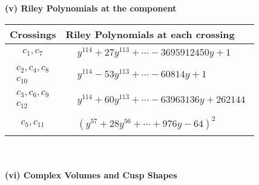 \documentclass[1p]{elsarticle_modified}
\theoremstyle{definition}
\begin{document}
\newpage\renewcommand{\arraystretch}{1}
\flushleft \textbf{(v) Riley Polynomials at the component}\newline \\
\begin{tabular}{m{50pt}|m{274pt}}
Crossings & \hspace{64pt}Riley Polynomials at each crossing \\
\hline $$\begin{aligned}c_{1},c_{7}\end{aligned}$$&$\begin{aligned}
&y^{114}+27 y^{113}+\cdots-3695912450 y+1
\end{aligned}$\\
\hline $$\begin{aligned}c_{2},c_{4},c_{8}\\c_{10}\end{aligned}$$&$\begin{aligned}
&y^{114}-53 y^{113}+\cdots-60814 y+1
\end{aligned}$\\
\hline $$\begin{aligned}c_{3},c_{6},c_{9}\\c_{12}\end{aligned}$$&$\begin{aligned}
&y^{114}+60 y^{113}+\cdots-63963136 y+262144
\end{aligned}$\\
\hline $$\begin{aligned}c_{5},c_{11}\end{aligned}$$&$\begin{aligned}
&(y^{57}+28 y^{56}+\cdots+976 y-64)^{2}
\end{aligned}$\\
\hline
\end{tabular}\\~\\
\newpage\flushleft \textbf{(vi) Complex Volumes and Cusp Shapes}
\end{document}
